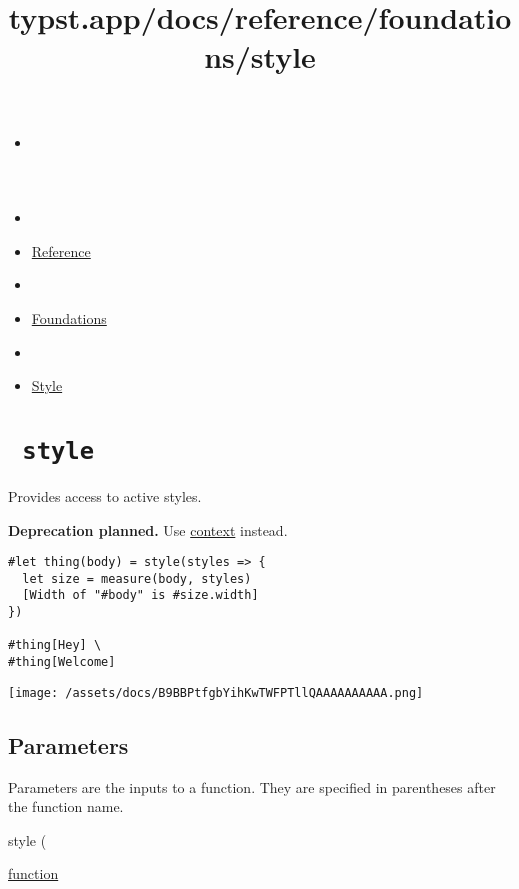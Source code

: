 \title{typst.app/docs/reference/foundations/style}

\begin{itemize}
\tightlist
\item
  \href{/docs}{}
\item
  
\item
  \href{/docs/reference/}{Reference}
\item
  
\item
  \href{/docs/reference/foundations/}{Foundations}
\item
  
\item
  \href{/docs/reference/foundations/style/}{Style}
\end{itemize}

\section{\texorpdfstring{\texttt{\ style\ }}{ style }}\label{summary}

Provides access to active styles.

\textbf{Deprecation planned.} Use
\href{/docs/reference/context/}{context} instead.

\begin{verbatim}
#let thing(body) = style(styles => {
  let size = measure(body, styles)
  [Width of "#body" is #size.width]
})

#thing[Hey] \
#thing[Welcome]
\end{verbatim}

\texttt{[image: /assets/docs/B9BBPtfgbYihKwTWFPTllQAAAAAAAAAA.png]}

\subsection{\texorpdfstring{{ Parameters
}}{ Parameters }}\label{parameters}

\label{parameters-tooltip}
Parameters are the inputs to a function. They are specified in
parentheses after the function name.

{ style } (

{ \href{/docs/reference/foundations/function/}{function} }

